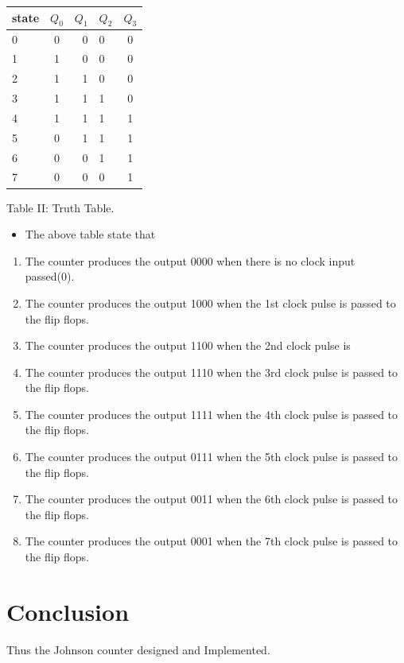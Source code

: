\documentclass[journal,12pt,twocolumn]{IEEEtran}
\begin{document}
\begin{center}
    
    \setlength{\arrayrulewidth}{0.5mm}
\setlength{\tabcolsep}{18pt}
\renewcommand{\arraystretch}{1.5}
    \begin{tabular}{|l|c|r|l|c|}
    \hline 
      \textbf{state} & \textbf{$ Q_{0} $} & \textbf{$ Q_{1} $} & \textbf{$ Q_{2} $} & \textbf{$ Q_{3} $}
      \\
      \hline
          0&0&0&0&0
          \\ 1&1&0&0&0
          \\ 2&1&1&0&0
          \\ 3&1&1&1&0
          \\ 4&1&1&1&1
          \\ 5&0&1&1&1
          \\ 6&0&0&1&1
          \\ 7&0&0&0&1 \\
      \hline
      
   \end{tabular}
   
   \vspace{0.5cm}
   \centering Table II: Truth Table.
\label{table:2}
 \end{center}
 \begin{itemize}
 \item The above table state that
 \end{itemize}
 \begin{enumerate}
 
\item The counter produces the output 0000 when there is no clock input passed(0).
\item  The counter produces the output 1000 when the 1st clock pulse is passed to the flip flops.
 \item  The counter produces the output 1100 when the 2nd clock pulse is  \item The counter produces the output 1110 when the 3rd clock pulse is passed to the flip flops.
\item The counter produces the output 1111 when the 4th clock pulse is  passed to the flip flops.
\item  The counter produces the output 0111 when the 5th clock pulse is passed to the flip flops.
\item The counter produces the output 0011 when the 6th clock pulse is passed to the flip flops.
\item The counter produces the output 0001 when the 7th clock pulse is passed to the flip flops.
 \end{enumerate}
 
 
 \section*{Conclusion}
 Thus the Johnson counter designed and Implemented.
\end{document}
